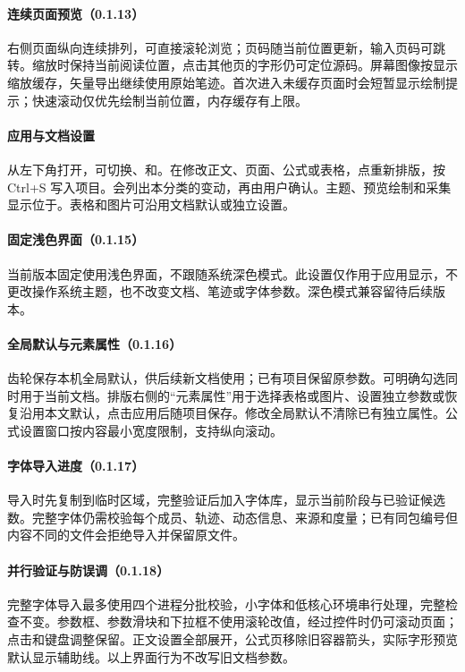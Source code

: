 \paragraph{连续页面预览（0.1.13）}右侧页面纵向连续排列，可直接滚轮浏览；页码随当前位置更新，输入页码可跳转。缩放时保持当前阅读位置，点击其他页的字形仍可定位源码。屏幕图像按显示缩放缓存，矢量导出继续使用原始笔迹。首次进入未缓存页面时会短暂显示绘制提示；快速滚动仅优先绘制当前位置，内存缓存有上限。

\paragraph{应用与文档设置}从左下角打开，可切换、和。在修改正文、页面、公式或表格，点重新排版，按 Ctrl+S 写入项目。会列出本分类的变动，再由用户确认。主题、预览绘制和采集显示位于。表格和图片可沿用文档默认或独立设置。

\paragraph{固定浅色界面（0.1.15）}当前版本固定使用浅色界面，不跟随系统深色模式。此设置仅作用于应用显示，不更改操作系统主题，也不改变文档、笔迹或字体参数。深色模式兼容留待后续版本。

\paragraph{全局默认与元素属性（0.1.16）}齿轮保存本机全局默认，供后续新文档使用；已有项目保留原参数。可明确勾选同时用于当前文档。排版右侧的“元素属性”用于选择表格或图片、设置独立参数或恢复沿用本文默认，点击应用后随项目保存。修改全局默认不清除已有独立属性。公式设置窗口按内容最小宽度限制，支持纵向滚动。

\paragraph{字体导入进度（0.1.17）}导入时先复制到临时区域，完整验证后加入字体库，显示当前阶段与已验证候选数。完整字体仍需校验每个成员、轨迹、动态信息、来源和度量；已有同包编号但内容不同的文件会拒绝导入并保留原文件。

\paragraph{并行验证与防误调（0.1.18）}完整字体导入最多使用四个进程分批校验，小字体和低核心环境串行处理，完整检查不变。参数框、参数滑块和下拉框不使用滚轮改值，经过控件时仍可滚动页面；点击和键盘调整保留。正文设置全部展开，公式页移除旧容器箭头，实际字形预览默认显示辅助线。以上界面行为不改写旧文档参数。

